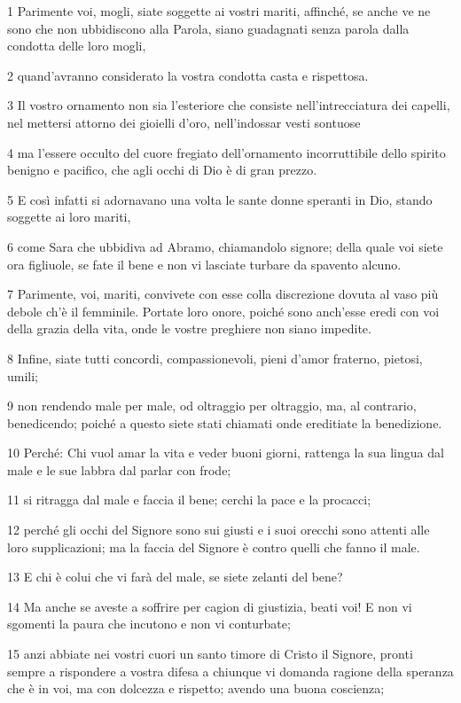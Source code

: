 \par 1 Parimente voi, mogli, siate soggette ai vostri mariti, affinché, se anche ve ne sono che non ubbidiscono alla Parola, siano guadagnati senza parola dalla condotta delle loro mogli,
\par 2 quand'avranno considerato la vostra condotta casta e rispettosa.
\par 3 Il vostro ornamento non sia l'esteriore che consiste nell'intrecciatura dei capelli, nel mettersi attorno dei gioielli d'oro, nell'indossar vesti sontuose
\par 4 ma l'essere occulto del cuore fregiato dell'ornamento incorruttibile dello spirito benigno e pacifico, che agli occhi di Dio è di gran prezzo.
\par 5 E così infatti si adornavano una volta le sante donne speranti in Dio, stando soggette ai loro mariti,
\par 6 come Sara che ubbidiva ad Abramo, chiamandolo signore; della quale voi siete ora figliuole, se fate il bene e non vi lasciate turbare da spavento alcuno.
\par 7 Parimente, voi, mariti, convivete con esse colla discrezione dovuta al vaso più debole ch'è il femminile. Portate loro onore, poiché sono anch'esse eredi con voi della grazia della vita, onde le vostre preghiere non siano impedite.
\par 8 Infine, siate tutti concordi, compassionevoli, pieni d'amor fraterno, pietosi, umili;
\par 9 non rendendo male per male, od oltraggio per oltraggio, ma, al contrario, benedicendo; poiché a questo siete stati chiamati onde ereditiate la benedizione.
\par 10 Perché: Chi vuol amar la vita e veder buoni giorni, rattenga la sua lingua dal male e le sue labbra dal parlar con frode;
\par 11 si ritragga dal male e faccia il bene; cerchi la pace e la procacci;
\par 12 perché gli occhi del Signore sono sui giusti e i suoi orecchi sono attenti alle loro supplicazioni; ma la faccia del Signore è contro quelli che fanno il male.
\par 13 E chi è colui che vi farà del male, se siete zelanti del bene?
\par 14 Ma anche se aveste a soffrire per cagion di giustizia, beati voi! E non vi sgomenti la paura che incutono e non vi conturbate;
\par 15 anzi abbiate nei vostri cuori un santo timore di Cristo il Signore, pronti sempre a rispondere a vostra difesa a chiunque vi domanda ragione della speranza che è in voi, ma con dolcezza e rispetto; avendo una buona coscienza;

